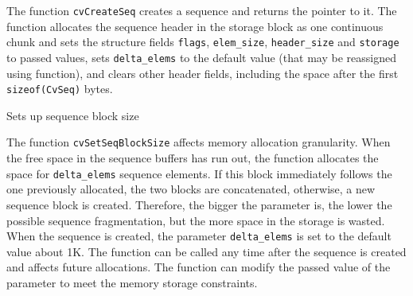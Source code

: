 \begin{description}
\end{description}

The function \texttt{cvCreateSeq} creates a sequence and returns
the pointer to it. The function allocates the sequence header in
the storage block as one continuous chunk and sets the structure
fields \texttt{flags}, \texttt{elem\_size}, \texttt{header\_size} and
\texttt{storage} to passed values, sets \texttt{delta\_elems} to the
default value (that may be reassigned using 
function), and clears other header fields, including the space after
the first \texttt{sizeof(CvSeq)} bytes.

\label{SetSeqBlockSize}

Sets up sequence block size


\begin{description}
\end{description}


The function \texttt{cvSetSeqBlockSize} affects memory allocation
granularity. When the free space in the sequence buffers has run out,
the function allocates the space for \texttt{delta\_elems} sequence
elements. If this block immediately follows the one previously allocated,
the two blocks are concatenated, otherwise, a new sequence block is
created. Therefore, the bigger the parameter is, the lower the possible
sequence fragmentation, but the more space in the storage is wasted. When
the sequence is created, the parameter \texttt{delta\_elems} is set to
the default value  about 1K. The function can be called any time after
the sequence is created and affects future allocations. The function
can modify the passed value of the parameter to meet the memory storage
constraints.

